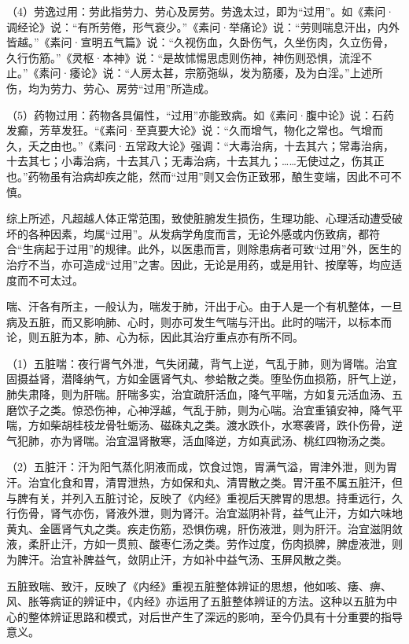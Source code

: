 \documentclass[12pt]{ctexbook}
\begin{document}
（4）劳逸过用：劳此指劳力、劳心及房劳。劳逸太过，即为“过用”。如《素问·调经论》说：“有所劳倦，形气衰少。”《素问·举痛论》说：“劳则喘息汗出，内外皆越。”《素问·宣明五气篇》说：“久视伤血，久卧伤气，久坐伤肉，久立伤骨，久行伤筋。”《灵枢·本神》说：“是故怵惕思虑则伤神，神伤则恐惧，流淫不止。”《素问·痿论》说：“人房太甚，宗筋㢮纵，发为筋痿，及为白淫。”上述所伤，均为劳力、劳心、房劳“过用”所造成。

（5）药物过用：药物各具偏性，“过用”亦能致病。如《素问·腹中论》说：石药发癫，芳草发狂。“《素问·至真要大论》说：“久而增气，物化之常也。气增而久，夭之由也。”《素问·五常政大论》强调：“大毒治病，十去其六；常毒治病，十去其七；小毒治病，十去其八；无毒治病，十去其九；……无使过之，伤其正也。”药物虽有治病却疾之能，然而“过用”则又会伤正致邪，酿生变端，因此不可不慎。

综上所述，凡超越人体正常范围，致使脏腑发生损伤，生理功能、心理活动遭受破坏的各种因素，均属“过用”。从发病学角度而言，无论外感或内伤致病，都符合“生病起于过用”的规律。此外，以医患而言，则除患病者可致“过用”外，医生的治疗不当，亦可造成“过用”之害。因此，无论是用药，或是用针、按摩等，均应适度而不可太过。



喘、汗各有所主，一般认为，喘发于肺，汗出于心。由于人是一个有机整体，一旦病及五脏，而又影响肺、心时，则亦可发生气喘与汗出。此时的喘汗，以标本而论，则五脏为本，肺、心为标，因此其治疗重点亦有所不同。

（1）五脏喘：夜行肾气外泄，气失闭藏，背气上逆，气乱于肺，则为肾喘。治宜固摄益肾，潜降纳气，方如金匮肾气丸、参蛤散之类。堕坠伤血损筋，肝气上逆，肺失肃降，则为肝喘。肝喘多实，治宜疏肝活血，降气平喘，方如复元活血汤、五磨饮子之类。惊恐伤神，心神浮越，气乱于肺，则为心喘。治宜重镇安神，降气平喘，方如柴胡桂枝龙骨牡蛎汤、磁硃丸之类。渡水跌仆，水寒袭肾，跌仆伤骨，逆气犯肺，亦为肾喘。治宜温肾散寒，活血降逆，方如真武汤、桃红四物汤之类。

（2）五脏汗：汗为阳气蒸化阴液而成，饮食过饱，胃满气溢，胃津外泄，则为胃汗。治宜化食和胃，清胃泄热，方如保和丸、清胃散之类。胃汗虽不属五脏汗，但与脾有关，并列入五脏讨论，反映了《内经》重视后天脾胃的思想。持重远行，久行伤骨，肾气亦伤，肾液外泄，则为肾汗。治宜滋阴补背，益气止汗，方如六味地黄丸、金匮肾气丸之类。疾走伤筋，恐惧伤魂，肝伤液泄，则为肝汗。治宜滋阴敛液，柔肝止汗，方如一贯煎、酸枣仁汤之类。劳作过度，伤肉损脾，脾虚液泄，则为脾汗。治宜补脾益气，敛阴止汗，方如补中益气汤、玉屏风散之类。

五脏致喘、致汗，反映了《内经》重视五脏整体辨证的思想，他如咳、痿、痹、风、胀等病证的辨证中，《内经》亦运用了五脏整体辨证的方法。这种以五脏为中心的整体辨证思路和模式，对后世产生了深远的影响，至今仍具有十分重要的指导意义。
\end{document}
